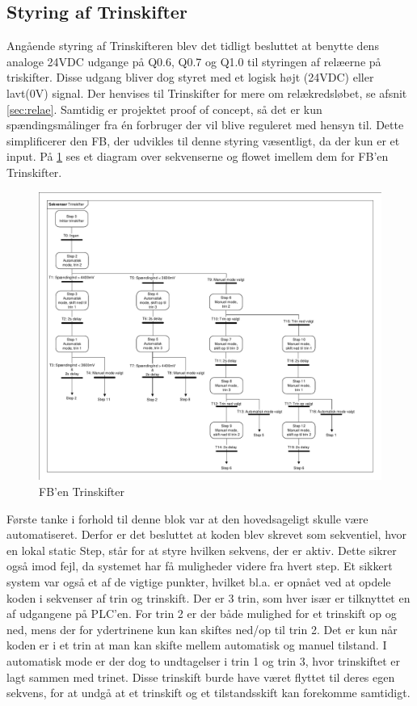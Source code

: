 \subsection{Styring af Trinskifter}

Angående styring af Trinskifteren blev det tidligt besluttet at benytte dens analoge 24VDC udgange på Q0.6, Q0.7 og Q1.0 til styringen af relæerne på triskifter. Disse udgang bliver dog styret med et logisk højt (24VDC) eller lavt(0V) signal. Der henvises til Trinskifter for mere om relækredsløbet, se afsnit \ref{sec:relae}.
Samtidig er projektet proof of concept, så det er kun spændingsmålinger fra én forbruger der vil blive reguleret med hensyn til. Dette simplificerer den FB, der udvikles til denne styring væsentligt, da der kun er et input. På \ref{fig:GraphTrinskifterPLC} ses et diagram over sekvenserne og flowet imellem dem for FB'en Trinskifter.

\begin{figure}[H] %
	\centering
	\includegraphics[width=1\textwidth]{Figure/GraphTrinskifterPLC}
	\caption{FB'en Trinskifter}
	\label{fig:GraphTrinskifterPLC}
\end{figure}

Første tanke i forhold til denne blok var at den hovedsageligt skulle være automatiseret. Derfor er det besluttet at koden blev skrevet som sekventiel, hvor en lokal static Step, står for at styre hvilken sekvens, der er aktiv. Dette sikrer også imod fejl, da systemet har få muligheder videre fra hvert step. Et sikkert system var også et af de vigtige punkter, hvilket bl.a. er opnået ved at opdele koden i sekvenser af trin og trinskift. Der er 3 trin, som hver især er tilknyttet en af udgangene på PLC'en. For trin 2 er der både mulighed for et trinskift op og ned, mens der for ydertrinene kun kan skiftes ned/op til trin 2. Det er kun når koden er i et trin at man kan skifte mellem automatisk og manuel tilstand. I automatisk mode er der dog to undtagelser i trin 1 og trin 3, hvor trinskiftet er lagt sammen med trinet. Disse trinskift burde have været flyttet til deres egen sekvens, for at undgå at et trinskift og et tilstandsskift kan forekomme samtidigt.


